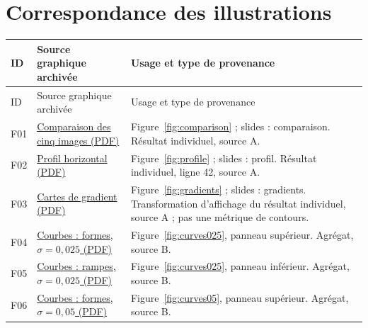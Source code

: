 \section{Correspondance des illustrations}
\noindent
\begin{longtable}{@{}p{0.9cm}p{6.1cm}p{7.7cm}@{}}
\toprule
ID & Source graphique archivée & Usage et type de provenance \\
\midrule
\endfirsthead
\toprule
ID & Source graphique archivée & Usage et type de provenance \\
\midrule
\endhead
F01 & \href{https://github.com/halhoulmhamed-droid/pde-image-denoising/blob/ae03109cdb2150b760e5a4b8bcffb56bba1b98e0/results/extended/figures/comparison.pdf}{Comparaison des cinq images (PDF)} & Figure~\ref{fig:comparison} ; slides : comparaison. Résultat individuel, source A. \\
F02 & \href{https://github.com/halhoulmhamed-droid/pde-image-denoising/blob/ae03109cdb2150b760e5a4b8bcffb56bba1b98e0/results/extended/figures/intensity_profile.pdf}{Profil horizontal (PDF)} & Figure~\ref{fig:profile} ; slides : profil. Résultat individuel, ligne 42, source A. \\
F03 & \href{https://github.com/halhoulmhamed-droid/pde-image-denoising/blob/ae03109cdb2150b760e5a4b8bcffb56bba1b98e0/results/extended/figures/gradient_maps.pdf}{Cartes de gradient (PDF)} & Figure~\ref{fig:gradients} ; slides : gradients. Transformation d'affichage du résultat individuel, source A ; pas une métrique de contours. \\
F04 & \href{https://github.com/halhoulmhamed-droid/pde-image-denoising/blob/ae03109cdb2150b760e5a4b8bcffb56bba1b98e0/results/extended/figures/metric_curves_geometric_shapes_sigma0p025.pdf}{Courbes : formes, $\sigma=0{,}025$ (PDF)} & Figure~\ref{fig:curves025}, panneau supérieur. Agrégat, source B. \\
F05 & \href{https://github.com/halhoulmhamed-droid/pde-image-denoising/blob/ae03109cdb2150b760e5a4b8bcffb56bba1b98e0/results/extended/figures/metric_curves_ramps_and_edges_sigma0p025.pdf}{Courbes : rampes, $\sigma=0{,}025$ (PDF)} & Figure~\ref{fig:curves025}, panneau inférieur. Agrégat, source B. \\
F06 & \href{https://github.com/halhoulmhamed-droid/pde-image-denoising/blob/ae03109cdb2150b760e5a4b8bcffb56bba1b98e0/results/extended/figures/metric_curves_geometric_shapes_sigma0p05.pdf}{Courbes : formes, $\sigma=0{,}05$ (PDF)} & Figure~\ref{fig:curves05}, panneau supérieur. Agrégat, source B. \\

\end{longtable}
